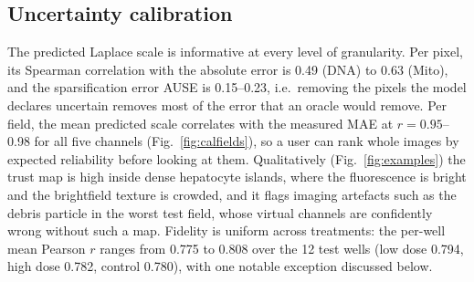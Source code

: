\documentclass[11pt,a4paper]{article}
\begin{document}
\subsection{Uncertainty calibration}
The predicted Laplace scale is informative at every level of granularity. Per pixel, its Spearman correlation with the absolute error is 0.49 (DNA) to 0.63 (Mito), and the sparsification error AUSE is 0.15--0.23, i.e.\ removing the pixels the model declares uncertain removes most of the error that an oracle would remove. Per field, the mean predicted scale correlates with the measured MAE at $r = 0.95$--0.98 for all five channels (Fig.~\ref{fig:calfields}), so a user can rank whole images by expected reliability before looking at them. Qualitatively (Fig.~\ref{fig:examples}) the trust map is high inside dense hepatocyte islands, where the fluorescence is bright and the brightfield texture is crowded, and it flags imaging artefacts such as the debris particle in the worst test field, whose virtual channels are confidently wrong without such a map. Fidelity is uniform across treatments: the per-well mean Pearson $r$ ranges from 0.775 to 0.808 over the 12 test wells (low dose 0.794, high dose 0.782, control 0.780), with one notable exception discussed below.
\end{document}
